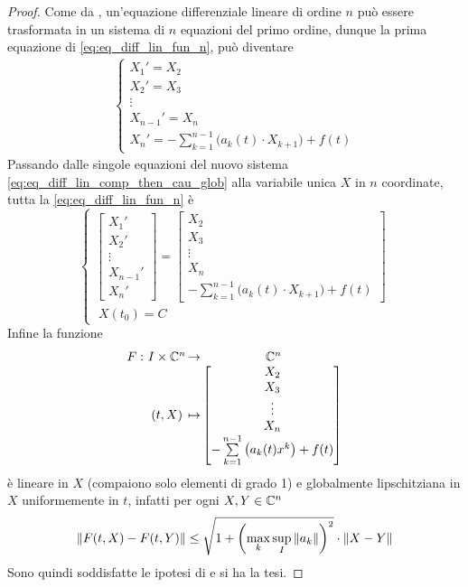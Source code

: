 \begin{proposition}
\begin{proof}
		Come da , un'equazione differenziale lineare di ordine $n$ può essere trasformata in un sistema di $n$ equazioni del primo ordine, dunque la prima equazione di \cref{eq:eq_diff_lin_fun_n}, può diventare
		\begin{align}
		\label{eq:eq_diff_lin_comp_then_cau_glob}
		\begin{cases}
			X_1' = X_2\\
			X_2' = X_3\\
			\vdots\\
			X_{n-1}' = X_{n}\\
			X_n' = -\sum\limits_{k=1}^{n-1}\bigl( a_k(t) \cdot X_{k+1} \bigr)+f(t)
		\end{cases}
		\end{align}
		Passando dalle singole equazioni del nuovo sistema \cref{eq:eq_diff_lin_comp_then_cau_glob} alla variabile unica $X$ in $n$ coordinate, tutta la \cref{eq:eq_diff_lin_fun_n} è
		\begin{equation*}
		\begin{cases}
			\left[\begin{matrix} X_1'\\X_2'\\\vdots\\X_{n-1}'\\X_n' \end{matrix}\right] = \left[\begin{matrix} X_2\\X_3\\\vdots\\X_{n}\\-\sum\limits_{k=1}^{n-1}\bigl( a_k(t) \cdot X_{k+1} \bigr)+f(t) \end{matrix}\right]\\
			\;X(t_0)=C
		\end{cases}
		\end{equation*}
		Infine la funzione
		\begin{equation*}
			\funcdef{F}{(t,X)}[I \times \C^n]{\qquad\qquad\quad\C^n}[ %
				\left[\begin{matrix} X_2\\X_3\\\vdots\\X_{n}\\-\sum\limits_{k=1}^{n-1}\left(a_k(t)x^k\right)+f(t) \end{matrix}\right]
			]
		\end{equation*}
		è lineare in $X$ (compaiono solo elementi di grado 1) e globalmente lipschitziana in $X$ uniformemente in $t$, infatti per ogni $X,Y\in\mathbb{C}^n$
		$$\left\|F(t,X)-F(t,Y)\right\|\le \sqrt{1+\left( \max\limits_k \sup\limits_I \left\|a_k\right\| \right)^2}\cdot\left\|X-Y\right\|$$ %
		Sono quindi soddisfatte le ipotesi di  e si ha la tesi.
	\end{proof}
\end{proposition}

